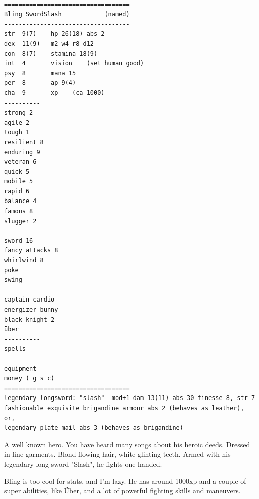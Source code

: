 \

\goodbreak \begin{samepage} \vsmall \begin{verbatim}
===================================
Bling SwordSlash            (named)
-----------------------------------
str  9(7)    hp 26(18) abs 2
dex  11(9)   m2 w4 r8 d12
con  8(7)    stamina 18(9)
int  4       vision    (set human good)
psy  8       mana 15
per  8       ap 9(4)
cha  9       xp -- (ca 1000)
----------
strong 2
agile 2
tough 1
resilient 8
enduring 9
veteran 6
quick 5
mobile 5
rapid 6
balance 4
famous 8
slugger 2

sword 16
fancy attacks 8
whirlwind 8
poke
swing

captain cardio
energizer bunny
black knight 2
über
----------
spells
----------
equipment
money ( g s c)
===================================
legendary longsword: "slash"  mod+1 dam 13(11) abs 30 finesse 8, str 7
fashionable exquisite brigandine armour abs 2 (behaves as leather), or,
legendary plate mail abs 3 (behaves as brigandine)
\end{verbatim} \normalsize \end{samepage}

A well known hero. You have heard many songs about his heroic deeds.
Dressed in fine garments. Blond flowing hair, white glinting teeth.
Armed with his legendary long sword "Slash", he fights one handed.

Bling is too cool for stats, and I'm lazy. He has around 1000xp
and a couple of super abilities, like Über, and a lot of powerful
fighting skills and maneuvers.


\

\flushbottom



























\clearpage
{}

